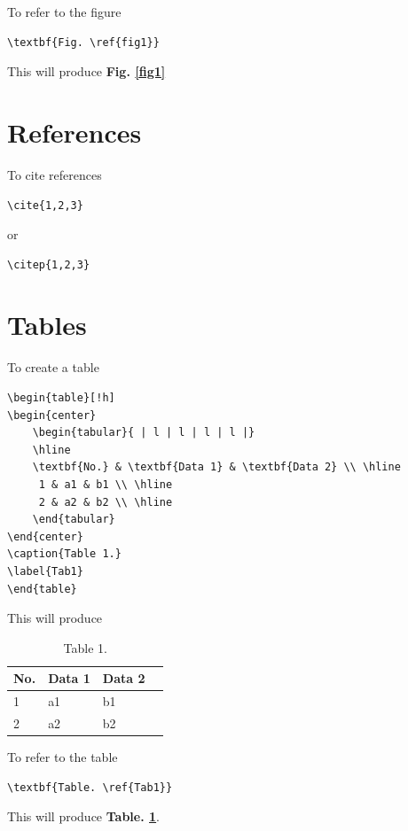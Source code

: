 \noindent To refer to the figure

\begin{verbatim}
\textbf{Fig. \ref{fig1}}
\end{verbatim}

\noindent This will produce \textbf{Fig. \ref{fig1}}

\section{References}

To cite references

\begin{verbatim}
\cite{1,2,3}
\end{verbatim}
or
\begin{verbatim}
\citep{1,2,3}
\end{verbatim}


\section{Tables}

To create a table

\begin{verbatim}
\begin{table}[!h]
\begin{center}
    \begin{tabular}{ | l | l | l | l |}
    \hline
    \textbf{No.} & \textbf{Data 1} & \textbf{Data 2} \\ \hline
     1 & a1 & b1 \\ \hline
     2 & a2 & b2 \\ \hline
    \end{tabular}
\end{center}
\caption{Table 1.}
\label{Tab1}
\end{table}
\end{verbatim}

\noindent This will produce

\begin{table}[!h]
\begin{center}
    \begin{tabular}{ | l | l | l | l |}
    \hline
    \textbf{No.} & \textbf{Data 1} & \textbf{Data 2} \\ \hline
     1 & a1 & b1 \\ \hline
     2 & a2 & b2 \\ \hline
    \end{tabular}
\end{center}
\caption{Table 1.}
\label{Tab1}
\end{table}

\noindent To refer to the table

\begin{verbatim}
\textbf{Table. \ref{Tab1}}
\end{verbatim}

\noindent This will produce \textbf{Table. \ref{Tab1}}.